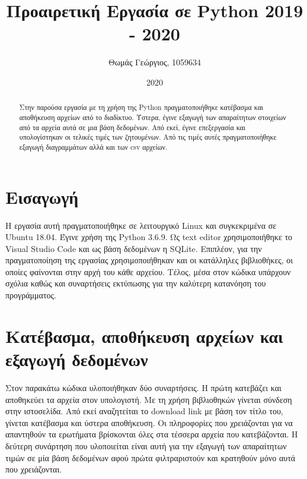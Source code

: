 \documentclass[a4paper]{article}
\title{Προαιρετική Εργασία σε \textlatin{Python} 2019 - 2020}
\author{Θωμάς Γεώργιος, 1059634}
\date{2020}
\begin{document}
\maketitle

\begin{abstract}
Στην παρούσα εργασία με τη χρήση της \textlatin{Python} πραγματοποιήθηκε κατέβασμα και αποθήκευση αρχείων από το διαδίκτυο. Ύστερα, έγινε εξαγωγή των απαραίτητων στοιχείων από τα αρχεία αυτά σε μια βάση δεδομένων. Από εκεί, έγινε επεξεργασία και υπολογίστηκαν οι τελικές τιμές των ζητουμένων. Από τις τιμές αυτές πραγματοποιήθηκε εξαγωγή διαγραμμάτων αλλά και των \textlatin{csv} αρχείων.
\end{abstract}


\section*{Εισαγωγή}
Η εργασία αυτή πραγματοποιήθηκε σε λειτουργικό \textlatin{Linux} και συγκεκριμένα σε \textlatin{Ubuntu 18.04}. Έγινε χρήση της \textlatin{Python 3.6.9}. Ως \textlatin{text editor} χρησιμοποιήθηκε το \textlatin{Visual Studio Code} και ως βάση δεδομένων η \textlatin{SQLite}. Επιπλέον, για την πραγματοποίηση της εργασίας χρησιμοποιήθηκαν και οι κατάλληλες βιβλιοθήκες, οι οποίες φαίνονται στην αρχή του κάθε αρχείου. Τέλος, μέσα στον κώδικα υπάρχουν σχόλια καθώς και συναρτήσεις εκτύπωσης για την καλύτερη κατανόηση του προγράμματος.


\section{Κατέβασμα, αποθήκευση αρχείων και εξαγωγή δεδομένων}
Στον παρακάτω κώδικα υλοποιήθηκαν δύο συναρτήσεις. Η πρώτη κατεβάζει και αποθηκεύει τα αρχεία στον υπολογιστή. Με τη χρήση βιβλιοθηκών γίνεται σύνδεση στην ιστοσελίδα. Από εκεί αναζητείται το \textlatin{download link} με βάση τον τίτλο του, γίνεται κατέβασμα και ύστερα αποθήκευση. Οι πληροφορίες που χρειάζονται για να απαντηθούν τα ερωτήματα βρίσκονται όλες στα τέσσερα αρχεία που κατεβάζονται. Η δεύτερη συνάρτηση που υλοποιείται είναι αυτή για την εξαγωγή των απαραίτητων τιμών σε μία βάση δεδομένων αφού πρώτα φιλτραριστούν και κρατηθούν μόνο αυτά που χρειάζονται.

\end{document}
